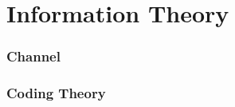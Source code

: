 \part{Information Theory}\label{part:information_theory} \cite{shannon48}

\section{Channel}\label{sec:channel}

\section{Coding Theory}\label{sec:coding_theory}
